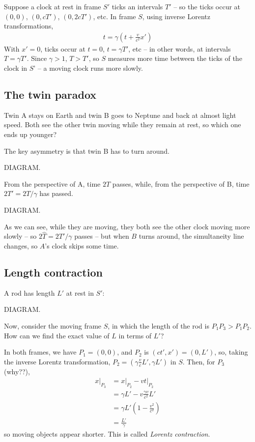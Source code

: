 \documentclass{../../template/note}
\begin{document}
    Suppose a clock at rest in frame \(S'\) ticks an intervals \(T'\) -- so the ticks occur at \((0, 0)\), \((0, cT')\), \((0, 2cT')\), etc. In frame \(S\), using inverse Lorentz transformations,
    \begin{align*}
        t = \gamma \left(t + \frac v{c^2}x'\right)
    \end{align*}
    With \(x'=0\), ticks occur at \(t = 0\), \(t = \gamma T'\), etc -- in other words, at intervals \(T = \gamma T'\). Since \(\gamma > 1\), \(T > T'\), so \(S\) measures more time between the ticks of the clock in \(S\)' -- a moving clock runs more slowly.
    
    \subsection{The twin paradox}

    Twin A stays on Earth and twin B goes to Neptune and back at almost light speed. Both see the other twin moving while they remain at rest, so which one ends up younger?
    
    The key asymmetry is that twin B has to turn around.
    
    DIAGRAM.

    From the perspective of A, time \(2T\) passes, while, from the perspective of B, time \(2T' = 2T/\gamma\) has passed.

    DIAGRAM.

    As we can see, while they are moving, they both see the other clock moving more slowly -- so \(2\hat T = 2T'/\gamma\) passes -- but when \(B\) turns around, the simultaneity line changes, so \(A\)'s clock skips some time.

    \subsection{Length contraction}

    A rod has length \(L'\) at rest in \(S'\):

    DIAGRAM.

    Now, consider the moving frame \(S\), in which the length of the rod is \(P_1P_3 > P_1P_2\). How can we find the exact value of \(L\) in terms of \(L'\)?

    In both frames, we have \(P_1 = (0, 0)\), and \(P_2\) is \((ct', x') = (0, L')\), so, taking the inverse Lorentz transformation, \(P_2 = (\gamma \frac v c L', \gamma L')\) in \(S\). Then, for \(P_3\) (why??),
    \begin{align*}
        \left.x\right|_{P_3} &= \left.x\right|_{P_2} - \left.vt\right|_{P_2} \\
        &= \gamma L' - v \frac{\gamma v}{c^2}L' \\
        &= \gamma L' \left(1-\frac{v^2}{c^2}\right) \\
        &= \frac{L'}{\gamma}
    \end{align*}
    so moving objects appear shorter. This is called \emph{Lorentz contraction}.
\end{document}
